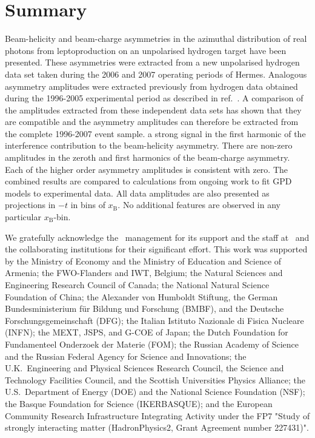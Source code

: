 \section{Summary}


Beam-helicity and beam-charge asymmetries in the azimuthal distribution of real photons from leptoproduction on an unpolarised hydrogen target have been presented. These asymmetries were extracted from a new unpolarised hydrogen data set taken during the 2006 and 2007 operating periods of H{\sc ermes}. Analogous asymmetry amplitudes were extracted previously from hydrogen data obtained during the 1996-2005 experimental period as described in ref.~\cite{Air09}. A comparison of the amplitudes extracted from these independent data sets has shown that they are compatible and the asymmetry amplitudes can therefore be extracted from the complete 1996-2007 event sample.  a strong signal in the first harmonic of the interference contribution to the beam-helicity asymmetry. There are non-zero amplitudes in the zeroth and first harmonics of the beam-charge asymmetry. Each of the higher order asymmetry amplitudes is consistent with zero. The combined results are compared to calculations from ongoing work to fit GPD models to experimental data. All data amplitudes are also presented as projections in $-t$ in bins of $x_{\textrm{B}}$. No additional features are observed in any particular $x_{\textrm{B}}$-bin.

\acknowledgments
We gratefully acknowledge the \desy\ management for its support and the staff
at \desy\ and the collaborating institutions for their significant effort.
This work was supported by 
the Ministry of Economy and the Ministry of Education and Science of Armenia;
the FWO-Flanders and IWT, Belgium;
the Natural Sciences and Engineering Research Council of Canada;
the National Natural Science Foundation of China;
the Alexander von Humboldt Stiftung,
the German Bundesministerium f\"ur Bildung und Forschung (BMBF), and
the Deutsche Forschungsgemeinschaft (DFG);
the Italian Istituto Nazionale di Fisica Nucleare (INFN);
the MEXT, JSPS, and G-COE of Japan;
the Dutch Foundation for Fundamenteel Onderzoek der Materie (FOM);
the Russian Academy of Science and the Russian Federal Agency for 
Science and Innovations;
the U.K.~Engineering and Physical Sciences Research Council, 
the Science and Technology Facilities Council,
and the Scottish Universities Physics Alliance;
the U.S.~Department of Energy (DOE) and the National Science Foundation (NSF);
the Basque Foundation for Science (IKERBASQUE);
and the European Community Research Infrastructure Integrating Activity
under the FP7 "Study of strongly interacting matter (HadronPhysics2, Grant
Agreement number 227431)".



